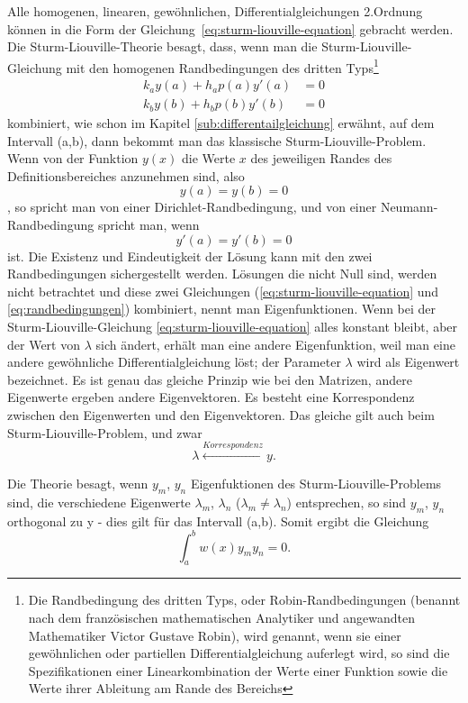 Alle homogenen, linearen, gewöhnlichen, Differentialgleichungen 2.Ordnung können in die Form der Gleichung~\eqref{eq:sturm-liouville-equation} gebracht werden.
Die Sturm-Liouville-Theorie besagt, dass, wenn man die Sturm-Liouville-Gleichung mit den homogenen Randbedingungen des dritten Typs\footnote{Die Randbedingung des dritten Typs, oder Robin-Randbedingungen (benannt nach dem französischen mathematischen Analytiker und angewandten Mathematiker Victor Gustave Robin), wird genannt, wenn sie einer gewöhnlichen oder partiellen Differentialgleichung auferlegt wird, so sind die Spezifikationen einer Linearkombination der Werte einer Funktion sowie die Werte ihrer Ableitung am Rande des Bereichs}
\begin{equation}
\begin{aligned}
	\label{eq:randbedingungen}
	k_a y(a) + h_a p(a) y'(a) &= 0 \\
	k_b y(b) + h_b p(b) y'(b) &= 0
\end{aligned}
\end{equation}
kombiniert, wie schon im Kapitel \ref{sub:differentailgleichung} erwähnt, auf dem Intervall (a,b), dann bekommt man das klassische Sturm-Liouville-Problem.
Wenn von der Funktion $y(x)$ die Werte $x$ des jeweiligen Randes des Definitionsbereiches anzunehmen sind, also
\[
	y(a) = y(b) = 0
\]
, so spricht man von einer Dirichlet-Randbedingung, und von einer Neumann-Randbedingung spricht man, wenn
\[
	y'(a) = y'(b) = 0
\]
ist. Die Existenz und Eindeutigkeit der Lösung kann mit den zwei Randbedingungen sichergestellt werden.
Lösungen die nicht Null sind, werden nicht betrachtet und diese zwei Gleichungen (\ref{eq:sturm-liouville-equation} und \ref{eq:randbedingungen}) kombiniert, nennt man Eigenfunktionen.
Wenn bei der Sturm-Liouville-Gleichung \ref{eq:sturm-liouville-equation} alles  konstant bleibt, aber der Wert von $\lambda$ sich ändert, erhält man eine andere Eigenfunktion, weil man eine andere gewöhnliche Differentialgleichung löst;
der Parameter $\lambda$ wird als Eigenwert bezeichnet.
Es ist genau das gleiche Prinzip wie bei den Matrizen, andere Eigenwerte ergeben andere Eigenvektoren.
Es besteht eine Korrespondenz zwischen den Eigenwerten und den Eigenvektoren.
Das gleiche gilt auch beim Sturm-Liouville-Problem, und zwar
\[
	\lambda \overset{Korrespondenz}\leftrightarrow y.
\]

Die Theorie besagt, wenn $y_m$, $y_n$ Eigenfuktionen des Sturm-Liouville-Problems sind, die verschiedene Eigenwerte $\lambda_m$, $\lambda_n$ ($\lambda_m \neq \lambda_n$) entsprechen, so sind $y_m$, $y_n$ orthogonal zu y -
dies gilt für das Intervall (a,b).
Somit ergibt die Gleichung
\[
	\int_{a}^{b} w(x)y_m y_n = 0.
\]

